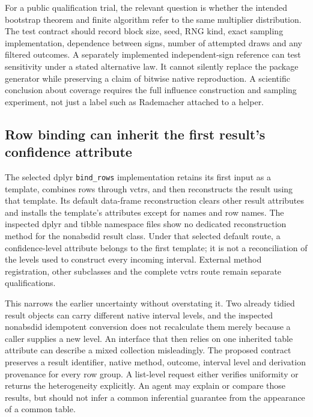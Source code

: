For a public qualification trial, the relevant question is whether the intended bootstrap theorem and finite algorithm refer to the same multiplier distribution. The test contract should record block size, seed, RNG kind, exact sampling implementation, dependence between signs, number of attempted draws and any filtered outcomes. A separately implemented independent-sign reference can test sensitivity under a stated alternative law. It cannot silently replace the package generator while preserving a claim of bitwise native reproduction. A scientific conclusion about coverage requires the full influence construction and sampling experiment, not just a label such as Rademacher attached to a helper.~\citep{exec29_panel_runtime_sources,exec29_panel_runtime_reference}

\subsection{Row binding can inherit the first result's confidence attribute}

The selected dplyr \texttt{bind\_rows} implementation retains its first input as a template, combines rows through vctrs, and then reconstructs the result using that template. Its default data-frame reconstruction clears other result attributes and installs the template's attributes except for names and row names. The inspected dplyr and tibble namespace files show no dedicated reconstruction method for the nonabsdid result class. Under that selected default route, a confidence-level attribute belongs to the first template; it is not a reconciliation of the levels used to construct every incoming interval. External method registration, other subclasses and the complete vctrs route remain separate qualifications.~\citep{exec29_panel_runtime_sources}

This narrows the earlier uncertainty without overstating it. Two already tidied result objects can carry different native interval levels, and the inspected nonabsdid idempotent conversion does not recalculate them merely because a caller supplies a new level. An interface that then relies on one inherited table attribute can describe a mixed collection misleadingly. The proposed contract preserves a result identifier, native method, outcome, interval level and derivation provenance for every row group. A list-level request either verifies uniformity or returns the heterogeneity explicitly. An agent may explain or compare those results, but should not infer a common inferential guarantee from the appearance of a common table.~\citep{exec29_panel_inference_sources,exec29_panel_runtime_sources}

